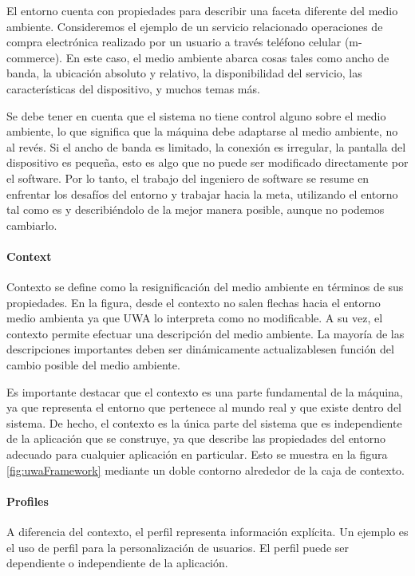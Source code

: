El entorno cuenta con propiedades para describir una faceta diferente del medio ambiente. Consideremos el ejemplo de un
servicio relacionado operaciones de compra electrónica realizado por un usuario a través teléfono celular (m-commerce). En este caso, el medio ambiente abarca cosas tales como ancho de banda, la ubicación absoluto y relativo, la disponibilidad del
servicio, las características del dispositivo, y muchos temas más.

Se debe tener en cuenta que el sistema no tiene control alguno sobre el medio ambiente, lo que significa que la máquina debe adaptarse al medio ambiente, no al revés. Si el ancho de banda es limitado, la conexión es irregular, la pantalla del dispositivo es pequeña, esto es algo que no puede ser modificado directamente por el software. Por lo tanto, el trabajo del ingeniero de software se resume en enfrentar los desafíos del entorno y trabajar hacia la meta, utilizando el entorno tal como es y describiéndolo de la mejor manera posible, aunque no podemos cambiarlo.


\paragraph{Context}

Contexto se define como la resignificación del medio ambiente en términos de sus propiedades. En la figura, desde el contexto no salen flechas hacia el entorno medio ambienta ya que UWA lo interpreta como no modificable. A su vez, el contexto permite efectuar una descripción del medio ambiente. La mayoría de las descripciones importantes deben ser dinámicamente 
actualizablesen función del cambio posible del medio ambiente. 

Es importante destacar que el contexto es una parte fundamental de la máquina, ya que representa el entorno que pertenece al mundo real y que existe dentro del sistema. De hecho, el contexto es la única parte del sistema que es independiente de la aplicación que se construye, ya que describe las propiedades del entorno adecuado para cualquier aplicación en particular. Esto se muestra en la figura \ref{fig:uwaFramework} mediante un doble contorno alrededor de la caja de contexto.


\paragraph{Profiles}

A diferencia del contexto, el perfil representa información explícita. Un ejemplo es el uso de perfil para la personalización de usuarios. El perfil puede ser dependiente o independiente de la aplicación.


